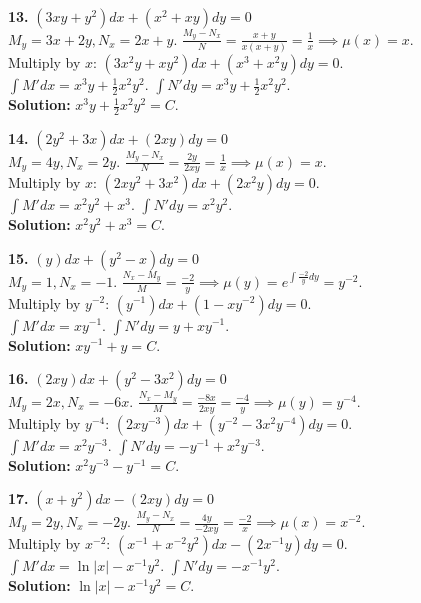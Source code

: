 \documentclass[11pt]{article}
\begin{document}
\textbf{13.} $(3xy + y^2) dx + (x^2 + xy) dy = 0$ \\
$M_y = 3x+2y, N_x = 2x+y$. $\frac{M_y - N_x}{N} = \frac{x+y}{x(x+y)} = \frac{1}{x} \implies \mu(x) = x$. \\
Multiply by $x$: $(3x^2y + xy^2) dx + (x^3 + x^2y) dy = 0$. \\
$\int M' dx = x^3 y + \frac{1}{2}x^2 y^2$. $\int N' dy = x^3 y + \frac{1}{2}x^2 y^2$. \\
\textbf{Solution:} $x^3 y + \frac{1}{2}x^2 y^2 = C$.

\vspace{0.5cm}
\textbf{14.} $(2y^2 + 3x) dx + (2xy) dy = 0$ \\
$M_y = 4y, N_x = 2y$. $\frac{M_y - N_x}{N} = \frac{2y}{2xy} = \frac{1}{x} \implies \mu(x) = x$. \\
Multiply by $x$: $(2xy^2 + 3x^2) dx + (2x^2y) dy = 0$. \\
$\int M' dx = x^2 y^2 + x^3$. $\int N' dy = x^2 y^2$. \\
\textbf{Solution:} $x^2 y^2 + x^3 = C$.

\vspace{0.5cm}
\textbf{15.} $(y) dx + (y^2 - x) dy = 0$ \\
$M_y = 1, N_x = -1$. $\frac{N_x - M_y}{M} = \frac{-2}{y} \implies \mu(y) = e^{\int \frac{-2}{y} dy} = y^{-2}$. \\
Multiply by $y^{-2}$: $(y^{-1}) dx + (1 - xy^{-2}) dy = 0$. \\
$\int M' dx = x y^{-1}$. $\int N' dy = y + x y^{-1}$. \\
\textbf{Solution:} $x y^{-1} + y = C$.

\vspace{0.5cm}
\textbf{16.} $(2xy) dx + (y^2 - 3x^2) dy = 0$ \\
$M_y = 2x, N_x = -6x$. $\frac{N_x - M_y}{M} = \frac{-8x}{2xy} = \frac{-4}{y} \implies \mu(y) = y^{-4}$. \\
Multiply by $y^{-4}$: $(2x y^{-3}) dx + (y^{-2} - 3x^2 y^{-4}) dy = 0$. \\
$\int M' dx = x^2 y^{-3}$. $\int N' dy = -y^{-1} + x^2 y^{-3}$. \\
\textbf{Solution:} $x^2 y^{-3} - y^{-1} = C$.

\vspace{0.5cm}
\textbf{17.} $(x + y^2) dx - (2xy) dy = 0$ \\
$M_y = 2y, N_x = -2y$. $\frac{M_y - N_x}{N} = \frac{4y}{-2xy} = \frac{-2}{x} \implies \mu(x) = x^{-2}$. \\
Multiply by $x^{-2}$: $(x^{-1} + x^{-2}y^2) dx - (2x^{-1}y) dy = 0$. \\
$\int M' dx = \ln|x| - x^{-1}y^2$. $\int N' dy = -x^{-1}y^2$. \\
\textbf{Solution:} $\ln|x| - x^{-1}y^2 = C$.
\end{document}
